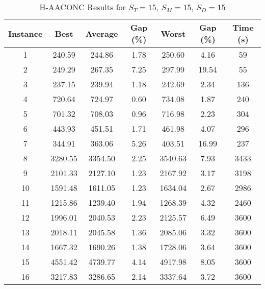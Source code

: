 \begin{table}[h]
	\centering
	\caption{H-AACONC Results for $S_T=15$, $S_M=15$, $S_D=15$}
	\begin{tabular}{@{}ccccccc@{}}
		\midrule
		\textbf{Instance} & \textbf{Best} & \textbf{Average} & \textbf{Gap (\%)} & \textbf{Worst} & \textbf{Gap (\%)} & \textbf{Time (s)} \\ \midrule
		1  & 240.59 & 244.86 & 1.78 & 250.60 & 4.16 & 59   \\ \midrule
		2  & 249.29 & 267.35 & 7.25 & 297.99 & 19.54 & 55  \\ \midrule
		3  & 237.15 & 239.94 & 1.18 & 242.69 & 2.34 & 136  \\ \midrule
		4  & 720.64 & 724.97 & 0.60 & 734.08 & 1.87 & 240  \\ \midrule
		5  & 701.32 & 708.03 & 0.96 & 716.98 & 2.23 & 304  \\ \midrule
		6  & 443.93 & 451.51 & 1.71 & 461.98 & 4.07 & 296  \\ \midrule
		7  & 344.91 & 363.06 & 5.26 & 403.51 & 16.99 & 237  \\ \midrule
		8  & 3280.55 & 3354.50 & 2.25 & 3540.63 & 7.93 & 3433  \\ \midrule
		9  & 2101.33 & 2127.10 & 1.23 & 2167.92 & 3.17 & 3198  \\ \midrule
		10 & 1591.48 & 1611.05 & 1.23 & 1634.04 & 2.67 & 2986  \\ \midrule
		11 & 1215.86 & 1239.40 & 1.94 & 1268.39 & 4.32 & 2460  \\ \midrule
		12 & 1996.01 & 2040.53 & 2.23 & 2125.57 & 6.49 & 3600  \\ \midrule
		13 & 2018.11 & 2045.58 & 1.36 & 2085.06 & 3.32 & 3600  \\ \midrule
		14 & 1667.32 & 1690.26 & 1.38 & 1728.06 & 3.64 & 3600  \\ \midrule
		15 & 4551.42 & 4739.77 & 4.14 & 4917.98 & 8.05 & 3600  \\ \midrule
		16 & 3217.83 & 3286.65 & 2.14 & 3337.64 & 3.72 & 3600  \\ \midrule
	\end{tabular}
	\label{table:ACO_15-15-15}
\end{table}